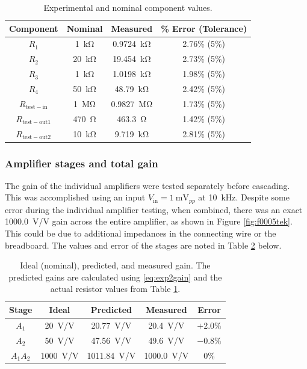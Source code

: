 \documentclass{report}
\newcommand{\pp}{_{pp}}
\newcommand{\Vpp}{\V\pp}
\begin{document}
	\begin{table}[H]
		\centering
		\caption{Experimental and nominal component values.}
		\label{table:lab2components}
		\begin{threeparttable}
			\begin{tabular}{cccc}
				\toprule
				Component & Nominal & Measured & \% Error (Tolerance) \\
				\midrule
				$R_1$ & \SI{1}{\kohm} & \SI{0.9724}{\kohm} & 2.76\% (5\%) \\
				$R_2$ & \SI{20}{\kohm} & \SI{19.454}{\kohm} & 2.73\% (5\%) \\
				$R_3$ & \SI{1}{\kohm} & \SI{1.0198}{\kohm} & 1.98\% (5\%) \\
				$R_4$ & \SI{50}{\kohm} & \SI{48.79}{\kohm} & 2.42\% (5\%) \\
				\midrule
				$R_\mathrm{test-in}$ & \SI{1}{\Mohm} & \SI{0.9827}{\Mohm} & 1.73\% (5\%) \\
				$R_\mathrm{test-out1}$ & \SI{470}{\ohm} & \SI{463.3}{\ohm} & 1.42\% (5\%) \\
				$R_\mathrm{test-out2}$ & \SI{10}{\kohm} & \SI{9.719}{\kohm} & 2.81\% (5\%) \\
				\bottomrule
			\end{tabular}
		\end{threeparttable}
	\end{table}
	
	\subsubsection{Amplifier stages and total gain}
	The gain of the individual amplifiers were tested separately before cascading. This was accomplished using an input $V_\mathrm{in} = \SI{1}{\milli\Vpp}$ at \SI{10}{\kHz}. Despite some error during the individual amplifier testing, when combined, there was an exact \SI{1000.0}{\V/\V} gain across the entire amplifier, as shown in Figure \ref{fig:f0005tek}. This could be due to additional impedances in the connecting wire or the breadboard. The values and error of the stages are noted in Table \ref{table:lab2gainvalues} below.
	
	\begin{table}[H]
		\centering
		\caption{Ideal (nominal), predicted, and measured gain. The predicted gains are calculated using \eqref{eq:exp2gain} and the actual resistor values from Table \ref{table:lab2components}.}
		\label{table:lab2gainvalues}
		\begin{threeparttable}
			\begin{tabular}{ccccc}
				\toprule
				Stage & Ideal & Predicted & Measured & Error \\
				\midrule
				$A_1$ & \SI{20}{\V/\V} & \SI{20.77}{\V/\V} & \SI{20.4}{\V/\V} & $+2.0\%$ \\
				$A_2$ & \SI{50}{\V/\V} & \SI{47.56}{\V/\V} & \SI{49.6}{\V/\V} & $-0.8\%$ \\
				$A_1 A_2$ & \SI{1000}{\V/\V} & \SI{1011.84}{\V/\V} & \SI{1000.0}{\V/\V} & $0\%$ \\
				\bottomrule
			\end{tabular}
		\end{threeparttable}
	\end{table}
\end{document}
